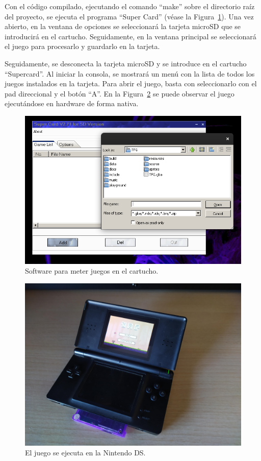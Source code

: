 Con el código compilado, ejecutando el comando ``make'' sobre el directorio raíz del proyecto, se ejecuta el programa ``Super Card'' (véase la Figura~\ref{fig:supercard_software}). Una vez abierto, en la ventana de opciones se seleccionará la tarjeta microSD que se introducirá en el cartucho. Seguidamente, en la ventana principal se seleccionará el juego para procesarlo y guardarlo en la tarjeta.

Seguidamente, se desconecta la tarjeta microSD y se introduce en el cartucho ``Supercard''. Al iniciar la consola, se mostrará un menú con la lista de todos los juegos instalados en la tarjeta. Para abrir el juego, basta con seleccionarlo con el pad direccional y el botón ``A''. En la Figura~\ref{fig:running} se puede observar  el juego ejecutándose en hardware de forma nativa.

\begin{figure}[h]
	\centering
	\includegraphics[width=.6\textwidth]{capitulos/capitulo6/supercard.png}
	\caption{Software para meter juegos en el cartucho.}\label{fig:supercard_software}
\end{figure}
\FloatBarrier{}

\begin{figure}[h]
	\centering
	\includegraphics[width=.8\textwidth]{capitulos/capitulo6/running.jpeg}
	\caption{El juego se ejecuta en la Nintendo DS.}\label{fig:running}
\end{figure}
\FloatBarrier{}
